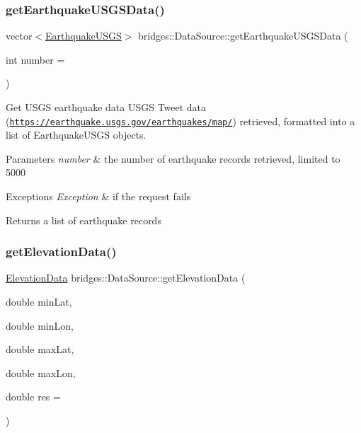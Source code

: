 \subsubsection{\texorpdfstring{get\+Earthquake\+U\+S\+G\+S\+Data()}{getEarthquakeUSGSData()}}
{\footnotesize\ttfamily vector$<$\hyperlink{classbridges_1_1dataset_1_1_earthquake_u_s_g_s}{Earthquake\+U\+S\+GS}$>$ bridges\+::\+Data\+Source\+::get\+Earthquake\+U\+S\+G\+S\+Data (\begin{DoxyParamCaption}\item[{int}]{number = {} }\end{DoxyParamCaption})\hspace{0.3cm}{\ttfamily [inline]}}



Get U\+S\+GS earthquake data U\+S\+GS Tweet data (\href{https://earthquake.usgs.gov/earthquakes/map/}{\tt https\+://earthquake.\+usgs.\+gov/earthquakes/map/}) retrieved, formatted into a list of Earthquake\+U\+S\+GS objects. 


\begin{DoxyParams}{Parameters}
{\em number} & the number of earthquake records retrieved, limited to 5000 \\
\hline
\end{DoxyParams}

\begin{DoxyExceptions}{Exceptions}
{\em Exception} & if the request fails\\
\hline
\end{DoxyExceptions}
\begin{DoxyReturn}{Returns}
a list of earthquake records 
\end{DoxyReturn}
\mbox{\label{classbridges_1_1_data_source_ac10b2fc8f5038adceb8e350be09ab52b}} 
\subsubsection{\texorpdfstring{get\+Elevation\+Data()}{getElevationData()}}
{\footnotesize\ttfamily \hyperlink{classbridges_1_1dataset_1_1_elevation_data}{Elevation\+Data} bridges\+::\+Data\+Source\+::get\+Elevation\+Data (\begin{DoxyParamCaption}\item[{double}]{min\+Lat,  }\item[{double}]{min\+Lon,  }\item[{double}]{max\+Lat,  }\item[{double}]{max\+Lon,  }\item[{double}]{res = {} }\end{DoxyParamCaption})\hspace{0.3cm}{\ttfamily [inline]}}

